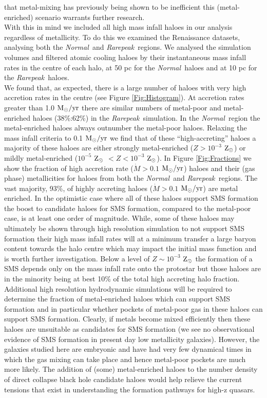 \documentclass[graphics, twocolumn, usenatbib]{mn2e}
\newcommand{\msolaryr} {$\rm{M_{\odot}/yr}~$}
\newcommand{\msolaryrc} {$\rm{M_{\odot}/yr}$}
\newcommand{\zsolar} {$\rm{Z_{\odot}}~$}
\newcommand{\zsolarc} {$\rm{Z_{\odot}}$}
\newcommand{\rarepeak} {\textit{Rarepeak~}}
\newcommand{\normal} {\textit{Normal~}}
\begin{document}
that metal-mixing has previously being shown to be inefficient \citep[e.g.][]{Smith_2015} this
(metal-enriched) scenario warrants further research. \\
\indent With this in mind we included all high mass infall haloes in our analysis regardless of
metallicity. To do this we examined the Renaissance datasets, analysing
both the \normal and \rarepeak regions. We analysed the simulation volumes and filtered atomic
cooling haloes by their instantaneous mass infall rates in the centre of each halo, at 50 pc for
the \normal haloes and at 10 pc for the \rarepeak haloes.  \\
\indent We found that, as expected, there is a large number of haloes with very high accretion rates
in the centre (see Figure \ref{Fig:Histogram}). At accretion rates
greater than 1.0 \msolaryr there are similar numbers of metal-poor and metal-enriched haloes
(38\%:62\%) in the \rarepeak simulation. In the \normal region the metal-enriched haloes always
outnumber the metal-poor haloes. Relaxing the mass infall criteria to 0.1  \msolaryr we find
that of these ``high-accreting'' haloes a majority of these haloes are either strongly
metal-enriched ($Z > 10^{-3}$ \zsolarc) or mildly metal-enriched
($10^{-5}$ \zsolar $ < Z < 10^{-3}$ \zsolarc). In Figure \ref{Fig:Fractions}  we show the fraction
of high accretion rate ($\dot{M} > 0.1$ \msolaryrc) haloes and their (gas phase) metallicities
for haloes from both the \normal and \rarepeak regions.
The vast majority, 93\%, of highly accreting haloes ($\dot{M} > 0.1$ \msolaryrc) are metal
enriched. In the optimistic case where all of these haloes support SMS formation the boost to
candidate haloes for SMS formation, compared to the metal-poor case, is at least one order of
magnitude. While,
some of these haloes may ultimately be shown through high resolution simulation to not support SMS
formation their high mass infall rates will at a minimum transfer a large baryon content towards the
halo centre which may impact the initial mass function and is worth further investigation.
Below a level of $Z \sim 10^{-3}$ \zsolar the formation of a SMS depends only on the mass infall
rate onto the protostar but those haloes are in the minority being at best 10\% of the total
high accreting halo fraction. \\
\indent Additional high resolution hydrodynamic simulations will be required to
determine the fraction of metal-enriched haloes which can support SMS formation and in particular
whether pockets of metal-poor gas in these haloes can support SMS formation. Clearly, if metals
  become mixed efficiently then these haloes are unsuitable as candidates for SMS formation (we see
no observational evidence of SMS formation in present day low metallicity galaxies). However,
the galaxies studied here are embryonic and have had very few dynamical times in which the
gas mixing can take place and hence metal-poor pockets are much more likely. The addition of (some)
metal-enriched haloes to the number density of direct collapse black hole candidate haloes
would help relieve the current tensions that exist in understanding the formation pathways for
high-z quasars. 
\end{document}
